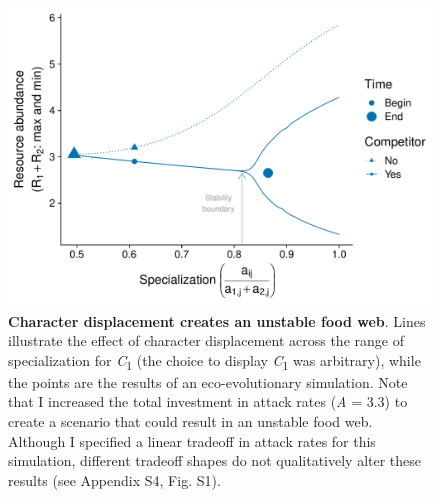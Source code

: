 \begin{figure}
\centering
\includegraphics{Fig_4_Bifurcation.pdf}
\caption{\label{fig:bifur_plot}\textbf{Character displacement creates an
unstable food web}. Lines illustrate the effect of character
displacement across the range of specialization for
\emph{C}\textsubscript{1} (the choice to display
\emph{C}\textsubscript{1} was arbitrary), while the points are the
results of an eco-evolutionary simulation. Note that I increased the
total investment in attack rates (\emph{A} = 3.3) to create a scenario
that could result in an unstable food web. Although I specified a linear
tradeoff in attack rates for this simulation, different tradeoff shapes
do not qualitatively alter these results (see Appendix S4, Fig. S1).}
\end{figure}

